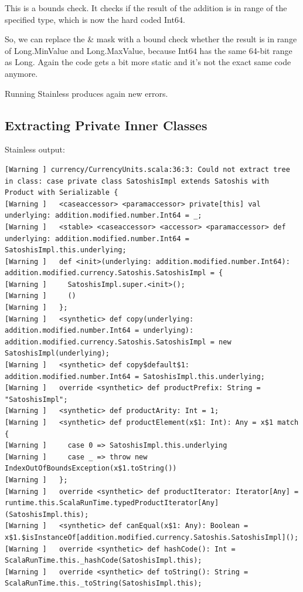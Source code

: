 \documentclass[runningheads]{llncs}
\begin{document}
This is a bounds check.
It checks if the result of the addition is in range of the specified type, which is now the hard coded Int64.

So, we can replace the \& mask with a bound check whether the result is in range of Long.MinValue and Long.MaxValue, because Int64 has the same 64-bit range as Long.
Again the code gets a bit more static and it's not the exact same code anymore.

Running Stainless produces again new errors.


\subsection{Extracting Private Inner Classes}

Stainless output:
\begin{lstlisting}[style=stainless]
[Warning ] currency/CurrencyUnits.scala:36:3: Could not extract tree in class: case private class SatoshisImpl extends Satoshis with Product with Serializable {
[Warning ]   <caseaccessor> <paramaccessor> private[this] val underlying: addition.modified.number.Int64 = _;
[Warning ]   <stable> <caseaccessor> <accessor> <paramaccessor> def underlying: addition.modified.number.Int64 = SatoshisImpl.this.underlying;
[Warning ]   def <init>(underlying: addition.modified.number.Int64): addition.modified.currency.Satoshis.SatoshisImpl = {
[Warning ]     SatoshisImpl.super.<init>();
[Warning ]     ()
[Warning ]   };
[Warning ]   <synthetic> def copy(underlying: addition.modified.number.Int64 = underlying): addition.modified.currency.Satoshis.SatoshisImpl = new SatoshisImpl(underlying);
[Warning ]   <synthetic> def copy$default$1: addition.modified.number.Int64 = SatoshisImpl.this.underlying;
[Warning ]   override <synthetic> def productPrefix: String = "SatoshisImpl";
[Warning ]   <synthetic> def productArity: Int = 1;
[Warning ]   <synthetic> def productElement(x$1: Int): Any = x$1 match {
[Warning ]     case 0 => SatoshisImpl.this.underlying
[Warning ]     case _ => throw new IndexOutOfBoundsException(x$1.toString())
[Warning ]   };
[Warning ]   override <synthetic> def productIterator: Iterator[Any] = runtime.this.ScalaRunTime.typedProductIterator[Any](SatoshisImpl.this);
[Warning ]   <synthetic> def canEqual(x$1: Any): Boolean = x$1.$isInstanceOf[addition.modified.currency.Satoshis.SatoshisImpl]();
[Warning ]   override <synthetic> def hashCode(): Int = ScalaRunTime.this._hashCode(SatoshisImpl.this);
[Warning ]   override <synthetic> def toString(): String = ScalaRunTime.this._toString(SatoshisImpl.this);

\end{lstlisting}
\end{document}
